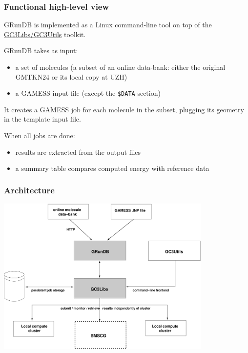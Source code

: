 \documentclass {beamer}
\newcommand{\largeskip}{\vspace{1em}}
\def\+{\largeskip}
\begin{document}
\begin{frame}
  \frametitle{Functional high-level view}

  GRunDB is implemented as a Linux command-line tool on top of the
  \href{http://gc3pie.googlecode.com/}{GC3Libs/GC3Utils} toolkit.

  \+
  GRunDB takes as input:
  \begin{itemize}
  \item a set of molecules (a subset of an online data-bank: either
    the original GMTKN24 or its local copy at UZH)
  \item a GAMESS input file (except the \texttt{\$DATA} section)
  \end{itemize}
  It creates a GAMESS job for each molecule in the subset, plugging
  its geometry in the template input file.

  \+
  When all jobs are done:
  \begin{itemize}
  \item results are extracted from the output files
  \item a summary table compares computed energy with reference data
  \end{itemize}

\end{frame}


\begin{frame}
  \frametitle{Architecture}

  \begin{center}
    \includegraphics[width=0.8\textwidth]{architecture}
  \end{center}
\end{frame}
\end{document}
